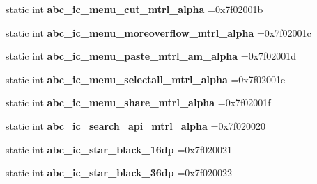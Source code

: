 \begin{DoxyCompactItemize}
static int {\bfseries abc\+\_\+ic\+\_\+menu\+\_\+cut\+\_\+mtrl\+\_\+alpha} =0x7f02001b
\item 
\mbox{\label{classandroid_1_1support_1_1v7_1_1recyclerview_1_1R_1_1drawable_a8adf39d54122703c3f0d6c1154454e10}} 
static int {\bfseries abc\+\_\+ic\+\_\+menu\+\_\+moreoverflow\+\_\+mtrl\+\_\+alpha} =0x7f02001c
\item 
\mbox{\label{classandroid_1_1support_1_1v7_1_1recyclerview_1_1R_1_1drawable_af79de6ef698a0843c96177ae0fbc9007}} 
static int {\bfseries abc\+\_\+ic\+\_\+menu\+\_\+paste\+\_\+mtrl\+\_\+am\+\_\+alpha} =0x7f02001d
\item 
\mbox{\label{classandroid_1_1support_1_1v7_1_1recyclerview_1_1R_1_1drawable_ac3f8f5599cf1334719d2bbbb2c6c205a}} 
static int {\bfseries abc\+\_\+ic\+\_\+menu\+\_\+selectall\+\_\+mtrl\+\_\+alpha} =0x7f02001e
\item 
\mbox{\label{classandroid_1_1support_1_1v7_1_1recyclerview_1_1R_1_1drawable_a91c8249e1354af0f4b0e24f853b322e5}} 
static int {\bfseries abc\+\_\+ic\+\_\+menu\+\_\+share\+\_\+mtrl\+\_\+alpha} =0x7f02001f
\item 
\mbox{\label{classandroid_1_1support_1_1v7_1_1recyclerview_1_1R_1_1drawable_a4baa0bc709dbd22ce3571100bbe6058d}} 
static int {\bfseries abc\+\_\+ic\+\_\+search\+\_\+api\+\_\+mtrl\+\_\+alpha} =0x7f020020
\item 
\mbox{\label{classandroid_1_1support_1_1v7_1_1recyclerview_1_1R_1_1drawable_abd2da52ed94d862e78c514acc36d4ae2}} 
static int {\bfseries abc\+\_\+ic\+\_\+star\+\_\+black\+\_\+16dp} =0x7f020021
\item 
\mbox{\label{classandroid_1_1support_1_1v7_1_1recyclerview_1_1R_1_1drawable_a16ff779e0ddd439daf96863ed95561cc}} 
static int {\bfseries abc\+\_\+ic\+\_\+star\+\_\+black\+\_\+36dp} =0x7f020022
\item 

\end{DoxyCompactItemize}
